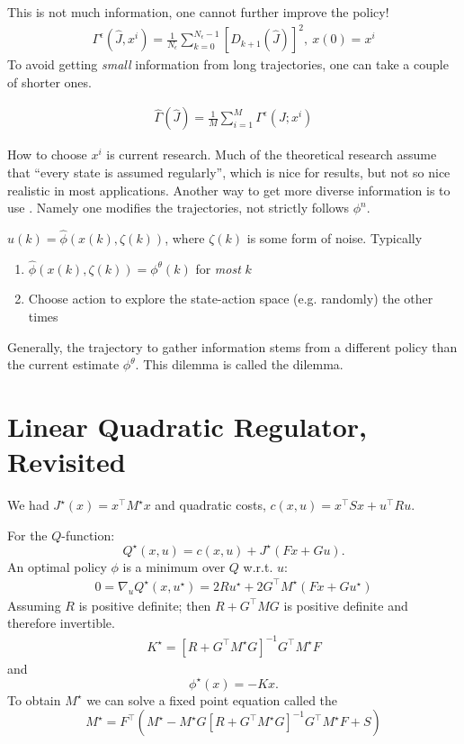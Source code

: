 This is not much information, one cannot further improve the policy! 
\begin{align*}
    \Gamma^\epsilon(\hat{J},x^i)=\frac{1}{N_\epsilon}\sum_{k=0}^{N_\epsilon-1}[D_{k+1}(\hat{J})]^2, \ x(0)=x^i
\end{align*}
To avoid getting \textit{small} information from long trajectories, one 
can take a couple of shorter ones.

\begin{align*}
    \hat{\Gamma}(\hat{J})=\frac{1}{M}\sum_{i=1}^M\Gamma^\epsilon(J;x^i)
\end{align*}

How to choose \(x^i\) is current research. Much of the theoretical research 
assume that ``every state is assumed regularly'', which is nice for results, but not so nice realistic 
in most applications. 
Another way to get more diverse information is to use . Namely
one modifies the trajectories, not strictly follows \(\phi^n\). 

\(u(k)=\hat{\phi}(x(k),\zeta(k))\), where \(\zeta(k)\) is some form of noise.
Typically 
\begin{enumerate}
    \item \(\hat{\phi}(x(k),\zeta(k))=\phi^\theta(k)\) for \textit{most} \(k\)
    \item Choose action to explore the state-action space (e.g. randomly) the other times
\end{enumerate}

Generally, the trajectory to gather information 
stems from a different policy than the current estimate \(\phi^\theta\). 
This dilemma is called the  dilemma.

\section{Linear Quadratic Regulator, Revisited} 

We had \(J^\star(x)=x^\intercal M^\star x\) and quadratic costs,
\(c(x,u)=x^\intercal S x+ u^\intercal R u\).

For the \(Q\)-function: 
\[Q^\star(x,u)=c(x,u)+J^\star(Fx+Gu).\]
An optimal policy \(\phi\) is a minimum over \(Q\) w.r.t. \(u\):
\begin{align*}
    0=\nabla_u Q^\star(x,u^\star)=2Ru^\star+2G^\intercal M^\star(Fx + Gu^\star)
\end{align*}
Assuming \(R\) is positive definite; then \(R+G^\intercal M G\) is positive definite
and therefore invertible.
\begin{align*}
    K^\star=\left[R+G^\intercal M^\star G\right]^{-1}G^\intercal M^\star F
\end{align*}
and 
\[\phi^\star(x)=-Kx.\]
To obtain \(M^\star\) we can solve
a fixed point equation called the 
\begin{equation}\label{eq:algebraic_riccati}
    M^\star=F^\intercal\left(M^\star-M^\star G\left[R+G^\intercal M^\star G\right]^{-1}G^\intercal M^\star F+S\right)
\end{equation} 
